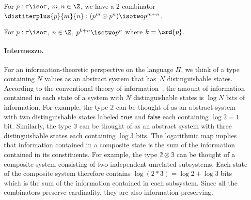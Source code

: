 
\begin{lemma}
\label{lem:distiterplus}
  For $p : \tau\iso\tau$, $m,n\in\Z$, we have a 2-combinator
  $\distiterplus{p}{m}{n} : (p^m \odot p^n) \isotwo p ^{m + n}$.
\end{lemma}

\begin{lemma}
  For $p : \tau \iso \tau$, $n \in \Z$, $p^{k + n} \isotwo p^n$ where
  $k = \ord{p}$.
\end{lemma}

\paragraph{Intermezzo.} For an information-theoretic perspective on
the language $\Pi$, we think of a type containing $N$ values as an
abstract system that has~$N$ distinguishable states. According to the
conventional theory of information~\cite{Shannon1948}, the amount of
information contained in each state of a system with $N$
distinguishable states is $\log N$ bits of information. For example,
the type $\mathbb{2}$ can be thought of as an abstract system with
two distinguishable states labeled $\mathsf{true}$ and
$\mathsf{false}$ each containing $\log 2 = 1$ bit. Similarly, the type
$\mathbb{3}$ can be thought of as an abstract system with three
distinguishable states each containing $\log 3$ bits. The logarithmic
map implies that information contained in a composite state is the sum
of the information contained in its constituents. For example, the
type $\mathbb{2} \otimes \mathbb{3}$ can be thought of a composite
system consisting of two independent unrelated subsystems. Each state
of the composite system therefore contains
$\log (2 * 3) = \log 2 + \log 3$ bits which is the sum of the
information contained in each subsystem. Since all the combinators
preserve cardinality, they are also information-preserving.


